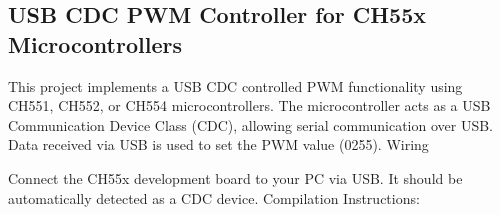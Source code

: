 \documentclass[letterpaper,10pt,english]{sphinxmanual}
\begin{document}
\begin{sphinxVerbatim}[commandchars=\\\{\}]
    
   
      
        
                  
        
           
\end{sphinxVerbatim}


\subsection{USB CDC PWM Controller for CH55x Microcontrollers}
\label{\detokenize{cdc:usb-cdc-pwm-controller-for-ch55x-microcontrollers}}
\sphinxAtStartPar
This project implements a USB CDC controlled PWM functionality using CH551, CH552, or CH554 microcontrollers. The microcontroller acts as a USB Communication Device Class (CDC), allowing serial communication over USB. Data received via USB is used to set the PWM value (0\sphinxhyphen{}255).
Wiring

\sphinxAtStartPar
Connect the CH55x development board to your PC via USB. It should be automatically detected as a CDC device.
Compilation Instructions:
\end{document}
